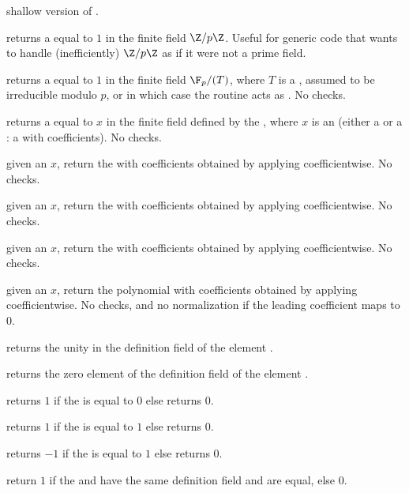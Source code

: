  shallow version of .

 returns a  equal to $1$ in the
finite field $\Z/p\Z$. Useful for generic code that wants to handle
(inefficiently) $\Z/p\Z$ as if it were not a prime field.

 returns a  equal to $1$ in the
finite field $\F_p/(T)$, where $T$ is a , assumed to be irreducible
modulo $p$, or  in which case the routine acts as .
No checks.

 returns a  equal to $x$
in the finite field defined by the  , where
$x$ is an  (either a  or a : a  with
 coefficients). No checks.

 given an  $x$,
return the  with  coefficients obtained by
applying  coefficientwise. No checks.

 given an  $x$,
return the  with  coefficients obtained by
applying  coefficientwise. No checks.

 given an  $x$,
return the  with  coefficients obtained by
applying  coefficientwise. No checks.

 given an  $x$,
return the polynomial with  coefficients obtained by
applying  coefficientwise. No checks, and no normalization
if the leading coefficient maps to $0$.

 returns the unity in the definition field of the
 element .

 returns the zero element of the definition field of
the  element .

 returns $1$ if the   is equal
to $0$ else returns $0$.

 returns $1$ if the   is equal
to $1$ else returns $0$.

 returns $-1$ if the   is equal
to $1$ else returns $0$.

 return $1$ if the   and
 have the same definition field and are equal, else $0$.

